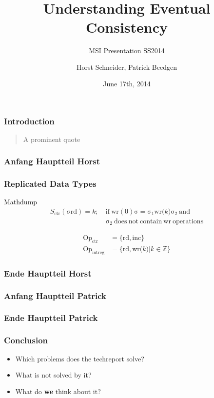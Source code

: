 \documentclass[11pt]{beamer}
\author{Horst Schneider, Patrick Beedgen}
\title{Understanding Eventual Consistency}
\subtitle{MSI Presentation SS2014}
\institute{Hochschule Mannheim}
\date{June 17th, 2014}
\begin{document}
\begin{frame}
\titlepage
\end{frame}


\begin{frame}
\frametitle{Introduction}
\begin{quotation}
\glqq A prominent quote\grqq
\end{quotation}
\end{frame}

\begin{frame}
\frametitle{Anfang Hauptteil Horst}
\end{frame}

\begin{frame}
\frametitle{Replicated Data Types}
\end{frame}

\begin{frame}
Mathdump
\begin{align*}
S_{\mathrm{ctr}} \mathrm{(\sigma rd) = }k;\ & \mathrm{if\ wr(0) \sigma = \sigma_1 wr(}k\mathrm{) \sigma_2\ and} \\
 & \mathrm{\sigma_2 \ does\ not\ contain\ wr\ operations}
\end{align*}


\begin{align*}
\mathrm{Op}_\mathrm{ctr} &= \mathrm{\{rd, inc\}} \\
\mathrm{Op}_\mathrm{intreg} &= \mathrm{\{rd, wr(}k \mathrm{)|} k \in \mathbb{Z} \mathrm{\}}
\end{align*}

\end{frame}

\begin{frame}
\frametitle{Ende Hauptteil Horst}
\end{frame}

\begin{frame}
\frametitle{Anfang Hauptteil Patrick}
\end{frame}


\begin{frame}
\frametitle{Ende Hauptteil Patrick}
\end{frame}


\begin{frame}
\frametitle{Conclusion}
\begin{itemize}
\item Which problems does the techreport solve?
\item What is not solved by it?
\item What do \textbf{we} think about it?
\end{itemize}
\end{frame}
\end{document}
